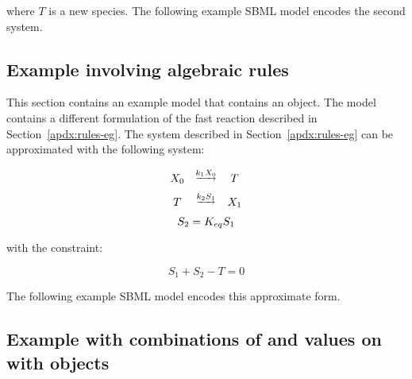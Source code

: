 where $T$ is a new species.  The following example SBML model
encodes the second system.



\subsection{Example involving algebraic rules}
\label{sec:algeraiceg}

This section contains an example model that contains an
\AlgebraicRule object.  The model contains a different
formulation of the fast reaction described in
Section~\ref{apdx:rules-eg}.  The system described in
Section~\ref{apdx:rules-eg} can be approximated with the following
system:
\begin{linenomath}
\begin{equation*}
  \begin{array}{@{}ccc@{}}
    X_0 & \overset{\underrightarrow{k_1 X_0}}{} & T \\[6pt]
    T & \overset{\underrightarrow{k_2 S_1}}{} & X_1
  \end{array}
\end{equation*}
\begin{equation*}
    S_2 = K_{eq} S_1\\[10pt]
\end{equation*}
\end{linenomath}
with the constraint:
\begin{linenomath}
\begin{equation*}
    S_1 + S_2 - T = 0
\end{equation*}
\end{linenomath}

The following example SBML model encodes this approximate form.



\subsection{Example with combinations of
   and  values on 
  with  objects}
\label{sec:constantspecieseg}

